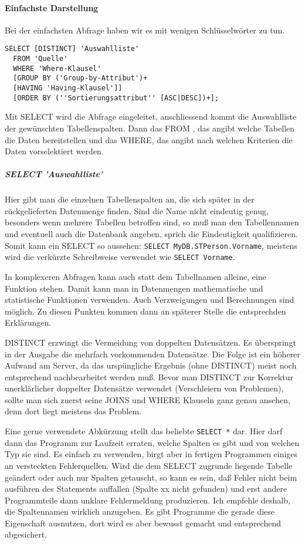 \paragraph{Einfachste Darstellung}
Bei der einfachsten Abfrage haben wir es mit wenigen Schlüsselwörter zu tun.
\begin{verbatim}
SELECT [DISTINCT] 'Auswahlliste'
  FROM 'Quelle'
  WHERE 'Where-Klausel'
  [GROUP BY ('Group-by-Attribut')+
  [HAVING 'Having-Klausel']]
  [ORDER BY (''Sortierungsattribut'' [ASC|DESC])+];
\end{verbatim}
Mit SELECT wird die Abfrage eingeleitet, anschliessend kommt die Auswahlliste der gewünschten Tabellenspalten. Dann das FROM , das angibt welche Tabellen die Daten bereitstellen und das WHERE, das angibt nach welchen Kriterien die Daten vorselektiert werden.
\subparagraph{SELECT 'Auswahlliste'}
Hier gibt man die einzelnen Tabellenspalten an, die sich später in der rückgelieferten Datenmenge finden. Sind die Name nicht eindeutig genug, besonders wenn mehrere Tabellen betroffen sind, so muß man den Tabellennamen und eventuell auch die Datenbank angeben, sprich die Eindeutigkeit qualifizieren. Somit kann ein SELECT so aussehen: \verb*|SELECT MyDB.STPerson.Vorname|, meistens wird die verkürzte Schreibweise verwendet wie \verb*|SELECT Vorname|. 

In komplexeren Abfragen kann auch statt dem Tabellnamen alleine, eine Funktion stehen. Damit kann man in Datenmengen mathematische und statistische Funktionen verwenden. Auch Verzweigungen und Berechnungen sind möglich. Zu diesen Punkten kommen dann an späterer Stelle die entsprechden Erklärungen.

DISTINCT erzwingt die Vermeidung von doppelten Datensätzen. Es überspringt in der Ausgabe die mehrfach vorkommenden Datensätze. Die Folge ist ein höherer Aufwand am Server, da das urspüngliche Ergebnis (ohne DISTINCT) meist noch entsprechend nachbearbeitet werden muß. Bevor man DISTINCT zur Korrektur unerklärlicher doppelter Datensätze verwendet (Verschleiern von Problemen), sollte man sich zuerst seine JOINS und WHERE Klauseln ganz genau ansehen, denn dort liegt meistens das Problem. 

Eine gerne verwendete Abkürzung stellt das beliebte \verb*|SELECT *| dar. Hier darf dann das Programm zur Laufzeit erraten, welche Spalten es gibt und von welchen Typ sie sind. Es einfach zu verwenden, birgt aber in fertigen Programmen einiges an versteckten Fehlerquellen. Wird die dem SELECT zugrunde liegende Tabelle geändert oder auch nur Spalten getauscht, so kann es sein, daß Fehler nicht beim ausführen des Statements auffallen (Spalte xx nicht gefunden) und erst andere Programmteile dann unklare Fehlermeldung produzieren. Ich empfehle deshalb, die Spaltennamen wirklich anzugeben. Es gibt Programme die gerade diese Eigenschaft ausnutzen, dort wird es aber bewusst gemacht und entsprechend abgesichert. 

